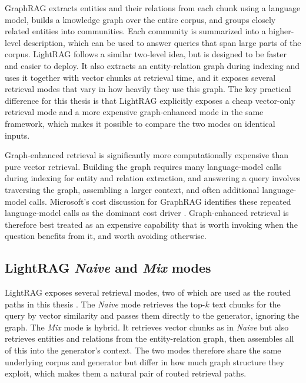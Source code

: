 \documentclass[english, bibtex]{kththesis}               %
\numberwithin{listing}{chapter}
\begin{document}
GraphRAG \cite{edge2024graphrag} extracts entities and their relations from each chunk using a language model, builds a knowledge graph over the entire corpus, and groups closely related entities into communities. Each community is summarized into a higher-level description, which can be used to answer queries that span large parts of the corpus. LightRAG \cite{lightrag2024} follows a similar two-level idea, but is designed to be faster and easier to deploy. It also extracts an entity-relation graph during indexing and uses it together with vector chunks at retrieval time, and it exposes several retrieval modes that vary in how heavily they use this graph. The key practical difference for this thesis is that LightRAG explicitly exposes a cheap vector-only retrieval mode and a more expensive graph-enhanced mode in the same framework, which makes it possible to compare the two modes on identical inputs.

Graph-enhanced retrieval is significantly more computationally expensive than pure vector retrieval. Building the graph requires many language-model calls during indexing for entity and relation extraction, and answering a query involves traversing the graph, assembling a larger context, and often additional language-model calls. Microsoft's cost discussion for GraphRAG identifies these repeated language-model calls as the dominant cost driver \cite{edge2024graphrag,microsoft2024graphragcosts}. Graph-enhanced retrieval is therefore best treated as an expensive capability that is worth invoking when the question benefits from it, and worth avoiding otherwise.

\subsection{LightRAG \emph{Naive} and \emph{Mix} modes}
\label{sec:backgroundLightragModes}

LightRAG exposes several retrieval modes, two of which are used as the routed paths in this thesis \cite{lightrag2024}. The \emph{Naive} mode retrieves the top-\(k\) text chunks for the query by vector similarity and passes them directly to the generator, ignoring the graph. The \emph{Mix} mode is hybrid. It retrieves vector chunks as in \emph{Naive} but also retrieves entities and relations from the entity-relation graph, then assembles all of this into the generator's context. The two modes therefore share the same underlying corpus and generator but differ in how much graph structure they exploit, which makes them a natural pair of routed retrieval paths.
\end{document}
